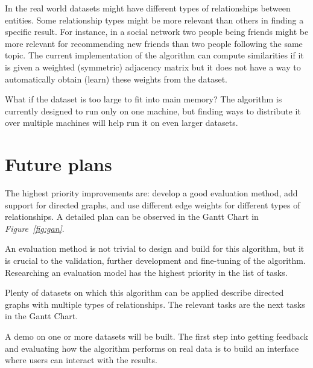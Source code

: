 \documentclass[12pt]{report}
\begin{document}
In the real world datasets might have different types of relationships between
entities. Some relationship types might be more relevant than others in finding
a specific result. For instance, in a social network two people being friends
might be more relevant for recommending new friends than two people following the
same topic. The current implementation of the algorithm can compute similarities
if it is given a weighted (symmetric) adjacency matrix but it does not have a
way to automatically obtain (learn) these weights from the dataset.


What if the dataset is too large to fit into main memory? The algorithm is
currently designed to run only on one machine, but finding ways to distribute it
over multiple machines will help run it on even larger datasets.

%
%
\section*{Future plans}
%
The highest priority improvements are: develop a good evaluation method, add support
for directed graphs, and use different edge weights for different types of relationships.
A detailed plan can be observed in the Gantt Chart in \emph{Figure~\ref{fig:gan}}.


An evaluation method is not trivial to design and build for this algorithm, but
it is crucial to the validation, further development and fine-tuning of the algorithm.
Researching an evaluation model has the highest priority in the list of tasks.


Plenty of datasets on which this algorithm can be applied describe directed graphs
with multiple types of relationships. The relevant tasks are the next tasks in
the Gantt Chart.


A demo on one or more datasets will be built. The first step into getting feedback
and evaluating how the algorithm performs on real data is to build an interface
where users can interact with the results.
\end{document}
